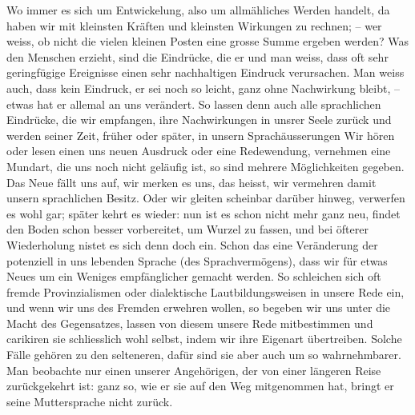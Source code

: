 {Wo immer es sich um  Entwickelung, also um allmähliches Werden handelt, da haben wir mit kleinsten Kräften und kleinsten Wirkungen zu rechnen; – wer weiss, ob nicht die vielen kleinen Posten eine grosse Summe ergeben werden? Was den Menschen erzieht, sind die Eindrücke, die er  und man weiss, dass oft sehr geringfügige Ereignisse einen sehr nachhaltigen Eindruck verursachen. Man weiss auch, dass kein Eindruck, er sei noch so leicht, ganz ohne Nachwirkung bleibt, – etwas hat er allemal an uns verändert. So lassen denn auch alle sprachlichen Eindrücke, die wir empfangen, ihre Nachwirkungen in unsrer Seele zurück und werden seiner Zeit, früher oder später, in unsern Sprachäusserungen  Wir hören oder lesen einen uns neuen Ausdruck oder eine Redewendung, vernehmen eine Mundart, die uns noch nicht geläufig ist, so sind mehrere Möglichkeiten gegeben. Das Neue fällt uns auf, wir merken es uns, das heisst, wir vermehren damit unsern sprachlichen Besitz. Oder wir gleiten scheinbar darüber hinweg, verwerfen es wohl gar; später kehrt es wieder: nun ist es schon nicht mehr ganz neu, findet den Boden schon besser vorbereitet, um Wurzel zu fassen, und bei öfterer \label{sp.274} Wiederholung nistet es sich denn doch ein. Schon das  eine Veränderung der potenziell in uns lebenden Sprache (des Sprachvermögens), dass wir für etwas Neues um ein Weniges empfänglicher gemacht werden. So schleichen sich oft fremde Provinzialismen oder dialektische Lautbildungsweisen in unsere Rede ein, und wenn wir uns des Fremden erwehren wollen, so begeben wir uns unter die Macht des Gegensatzes, lassen von diesem unsere Rede mitbestimmen und carikiren sie schliesslich wohl selbst, indem wir ihre \label{fp.268} Eigenart übertreiben. Solche Fälle gehören zu den selteneren, dafür sind sie aber auch um so wahrnehmbarer. Man beobachte nur einen unserer Angehörigen, der von einer längeren Reise zurückgekehrt ist: ganz so, wie er sie auf den Weg mitgenommen hat, bringt er seine Muttersprache nicht zurück.

}
